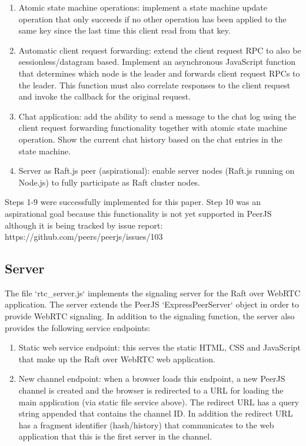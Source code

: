 \documentclass[9pt]{extarticle}
\begin{document}
\begin{multicols}{2}
\begin{enumerate}
\item Atomic state machine operations: implement a state machine update operation that only succeeds if no other operation has been applied to the same key since the last time this client read from that key.

\item Automatic client request forwarding: extend the client request RPC to also be sessionless/datagram based. Implement an asynchronous JavaScript function that determines which node is the leader and forwards client request RPCs to the leader. This function must also correlate responses to the client request and invoke the callback for the original request.

\item Chat application: add the ability to send a message to the chat log using the client request forwarding functionality together with atomic state machine operation. Show the current chat history based on the chat entries in the state machine.

\item Server as Raft.js peer (aspirational): enable server nodes (Raft.js running on Node.js) to fully participate as Raft cluster nodes.
\end{enumerate}

Steps 1-9 were successfully implemented for this paper. Step 10 was an
aspirational goal because this functionality is not yet supported in
PeerJS although it is being tracked by issue report:
https://github.com/peers/peerjs/issues/103

\subsection{Server}

The file `rtc\_server.js` implements the signaling server for the Raft
over WebRTC application. The server extends the PeerJS
`ExpressPeerServer` object in order to provide WebRTC signaling. In
addition to the signaling function, the server also provides the
following service endpoints:

\begin{enumerate}
\item Static web service endpoint: this serves the static HTML, CSS and JavaScript that make up the Raft over WebRTC web application.

\item New channel endpoint: when a browser loads this endpoint, a new PeerJS channel is created and the browser is redirected to a URL for loading the main application (via static file service above).  The redirect URL has a query string appended that contains the channel ID. In addition the redirect URL has a fragment identifier (hash/history) that communicates to the web application that this is the first server in the channel.


\end{enumerate}
\end{multicols}
\end{document}
